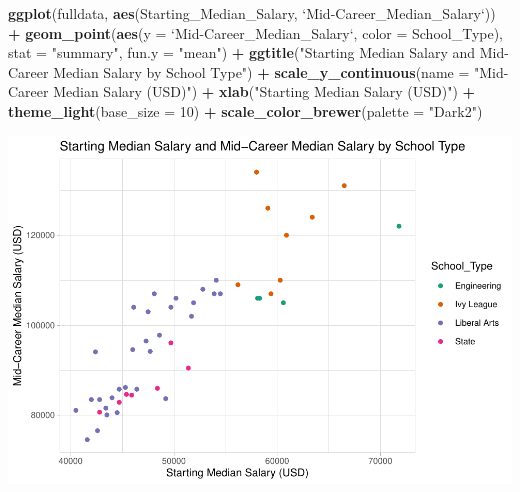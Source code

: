 \documentclass[]{article}
\newenvironment{Shaded}{\begin{snugshade}}{\end{snugshade}}
\newcommand{\KeywordTok}[1]{\textcolor[rgb]{0.13,0.29,0.53}{\textbf{#1}}}
\newcommand{\DataTypeTok}[1]{\textcolor[rgb]{0.13,0.29,0.53}{#1}}
\newcommand{\DecValTok}[1]{\textcolor[rgb]{0.00,0.00,0.81}{#1}}
\newcommand{\StringTok}[1]{\textcolor[rgb]{0.31,0.60,0.02}{#1}}
\newcommand{\OperatorTok}[1]{\textcolor[rgb]{0.81,0.36,0.00}{\textbf{#1}}}
\newcommand{\NormalTok}[1]{#1}
\begin{document}
\begin{Shaded}
\begin{Highlighting}[]
\KeywordTok{ggplot}\NormalTok{(fulldata, }\KeywordTok{aes}\NormalTok{(Starting_Median_Salary, }\StringTok{`}\DataTypeTok{Mid-Career_Median_Salary}\StringTok{`}\NormalTok{)) }\OperatorTok{+}\StringTok{ }
\StringTok{    }\KeywordTok{geom_point}\NormalTok{(}\KeywordTok{aes}\NormalTok{(}\DataTypeTok{y =} \StringTok{`}\DataTypeTok{Mid-Career_Median_Salary}\StringTok{`}\NormalTok{, }\DataTypeTok{color =}\NormalTok{ School_Type), }
        \DataTypeTok{stat =} \StringTok{"summary"}\NormalTok{, }\DataTypeTok{fun.y =} \StringTok{"mean"}\NormalTok{) }\OperatorTok{+}\StringTok{ }\KeywordTok{ggtitle}\NormalTok{(}\StringTok{"Starting Median Salary and Mid-Career Median Salary by School Type"}\NormalTok{) }\OperatorTok{+}\StringTok{ }
\StringTok{    }\KeywordTok{scale_y_continuous}\NormalTok{(}\DataTypeTok{name =} \StringTok{"Mid-Career Median Salary (USD)"}\NormalTok{) }\OperatorTok{+}\StringTok{ }
\StringTok{    }\KeywordTok{xlab}\NormalTok{(}\StringTok{"Starting Median Salary (USD)"}\NormalTok{) }\OperatorTok{+}\StringTok{ }\KeywordTok{theme_light}\NormalTok{(}\DataTypeTok{base_size =} \DecValTok{10}\NormalTok{) }\OperatorTok{+}\StringTok{ }
\StringTok{    }\KeywordTok{scale_color_brewer}\NormalTok{(}\DataTypeTok{palette =} \StringTok{"Dark2"}\NormalTok{)}
\end{Highlighting}
\end{Shaded}

\begin{center}\includegraphics{project1_files/figure-latex/unnamed-chunk-4-2} \end{center}
\end{document}
